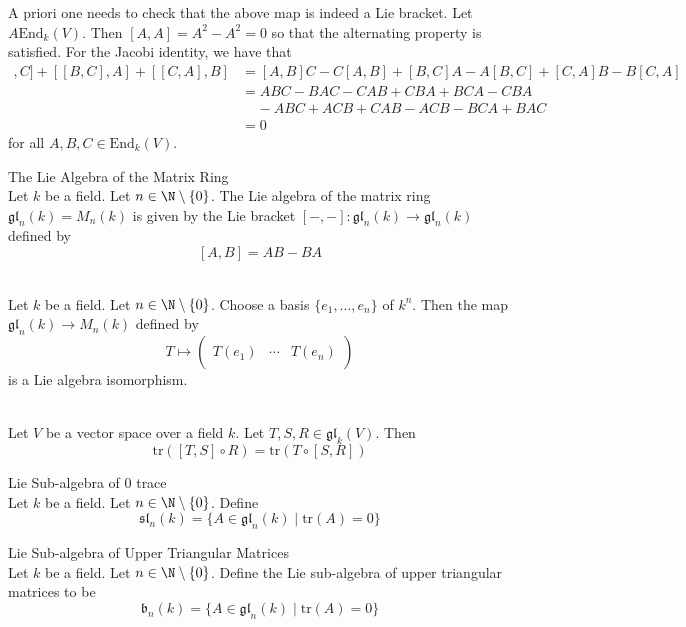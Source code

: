 \documentclass[a4paper]{article}
\begin{document}
A priori one needs to check that the above map is indeed a Lie bracket. Let $A\text{End}_k(V)$. Then $[A,A]=A^2-A^2=0$ so that the alternating property is satisfied. For the Jacobi identity, we have that 
\begin{align*}
[[A,B],C]+[[B,C],A]+[[C,A],B]&=[A,B]C-C[A,B]+[B,C]A-A[B,C]+[C,A]B-B[C,A]\\
&=ABC-BAC-CAB+CBA+BCA-CBA\\
&\;\;\;\;-ABC+ACB+CAB-ACB-BCA+BAC\\
&=0
\end{align*}
for all $A,B,C\in\text{End}_k(V)$. 

\begin{defn}{The Lie Algebra of the Matrix Ring}{} \\Let $k$ be a field. Let $n\in\N\setminus\{0\}$. The Lie algebra of the matrix ring $\mathfrak{gl}_n(k)=M_n(k)$ is given by the Lie bracket $[-,-]:\mathfrak{gl}_n(k)\to\mathfrak{gl}_n(k)$ defined by $$[A,B]=AB-BA$$
\end{defn}

\begin{prp}{}{} \\Let $k$ be a field. Let $n\in\N\setminus\{0\}$. Choose a basis $\{e_1,\dots,e_n\}$ of $k^n$. Then the map $\mathfrak{gl}_n(k)\to M_n(k)$ defined by $$T\mapsto\begin{pmatrix}&&\\
T(e_1) & \cdots & T(e_n)\\
&&
\end{pmatrix}$$ is a Lie algebra isomorphism. 
\end{prp}

\begin{lmm}{}{} \\Let $V$ be a vector space over a field $k$. Let $T,S,R\in\mathfrak{gl}_k(V)$. Then $$\text{tr}([T,S]\circ R)=\text{tr}(T\circ [S,R])$$
\end{lmm}

\begin{defn}{Lie Sub-algebra of 0 trace}{} \\Let $k$ be a field. Let $n\in\N\setminus\{0\}$. Define $$\mathfrak{sl}_n(k)=\{A\in\mathfrak{gl}_n(k)\;|\;\text{tr}(A)=0\}$$
\end{defn}

\begin{defn}{Lie Sub-algebra of Upper Triangular Matrices}{} \\Let $k$ be a field. Let $n\in\N\setminus\{0\}$. Define the Lie sub-algebra of upper triangular matrices to be $$\mathfrak{b}_n(k)=\{A\in\mathfrak{gl}_n(k)\;|\;\text{tr}(A)=0\}$$
\end{defn}
\end{document}
